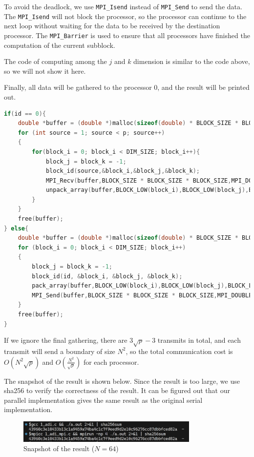To avoid the deadlock, we use \texttt{MPI\_Isend} instead of \texttt{MPI\_Send} to send the data. The \texttt{MPI\_Isend} will not block the processor, so the processor can continue to the next loop without waiting for the data to be received by the destination processor. The \texttt{MPI\_Barrier} is used to ensure that all processors have finished the computation of the current subblock.

The code of computing among the $j$ and $k$ dimension is similar to the code above, so we will not show it here.

Finally, all data will be gathered to the processor 0, and the result will be printed out.

\begin{lstlisting}[language=C]
if(id == 0){
    double *buffer = (double *)malloc(sizeof(double) * BLOCK_SIZE * BLOCK_SIZE * BLOCK_SIZE);
    for (int source = 1; source < p; source++)
    {
        for(block_i = 0; block_i < DIM_SIZE; block_i++){
            block_j = block_k = -1;
            block_id(source,&block_i,&block_j,&block_k);
            MPI_Recv(buffer,BLOCK_SIZE * BLOCK_SIZE * BLOCK_SIZE,MPI_DOUBLE,source,0,MPI_COMM_WORLD,MPI_STATUS_IGNORE);
            unpack_array(buffer,BLOCK_LOW(block_i),BLOCK_LOW(block_j),BLOCK_LOW(block_k),BLOCK_HIGH(block_i),BLOCK_HIGH(block_j),BLOCK_HIGH(block_k));
        }
    }
    free(buffer);
} else{
    double *buffer = (double *)malloc(sizeof(double) * BLOCK_SIZE * BLOCK_SIZE * BLOCK_SIZE);
    for (block_i = 0; block_i < DIM_SIZE; block_i++)
    {
        block_j = block_k = -1;
        block_id(id, &block_i, &block_j, &block_k);
        pack_array(buffer,BLOCK_LOW(block_i),BLOCK_LOW(block_j),BLOCK_LOW(block_k),BLOCK_HIGH(block_i),BLOCK_HIGH(block_j),BLOCK_HIGH(block_k));
        MPI_Send(buffer,BLOCK_SIZE * BLOCK_SIZE * BLOCK_SIZE,MPI_DOUBLE,0,0,MPI_COMM_WORLD);
    }
    free(buffer);
}
\end{lstlisting}

If we ignore the final gathering, there are $3\sqrt p - 3$ transmits in total, and each transmit will send a boundary of size $N^2$, so the total communication cost is $O(N^2\sqrt p)$ and $O(\frac{N^2}{\sqrt p})$ for each processor.

The snapshot of the result is shown below. Since the result is too large, we use sha256 to verify the correctness of the result. It can be figured out that our parallel implementation gives the same result as the original serial implementation.

\begin{figure}[h]
    \centering
    \includegraphics[width=0.8\textwidth]{fig-adi-64.png}
    \caption{Snapshot of the result ($N=64$)}
    \label{fig:adi-64}
\end{figure}

